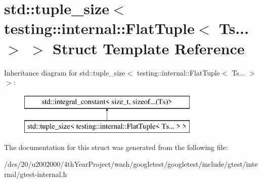 \hypertarget{structstd_1_1tuple__size_3_01testing_1_1internal_1_1FlatTuple_3_01Ts_8_8_8_01_4_01_4}{}\section{std\+:\+:tuple\+\_\+size$<$ testing\+:\+:internal\+:\+:Flat\+Tuple$<$ Ts... $>$ $>$ Struct Template Reference}
\label{structstd_1_1tuple__size_3_01testing_1_1internal_1_1FlatTuple_3_01Ts_8_8_8_01_4_01_4}
Inheritance diagram for std\+:\+:tuple\+\_\+size$<$ testing\+:\+:internal\+:\+:Flat\+Tuple$<$ Ts... $>$ $>$\+:\begin{figure}[H]
\begin{center}
\leavevmode
\includegraphics[height=2.000000cm]{structstd_1_1tuple__size_3_01testing_1_1internal_1_1FlatTuple_3_01Ts_8_8_8_01_4_01_4}
\end{center}
\end{figure}


The documentation for this struct was generated from the following file\+:\begin{DoxyCompactItemize}
\item 
/dcs/20/u2002000/4th\+Year\+Project/wash/googletest/googletest/include/gtest/internal/gtest-\/internal.\+h\end{DoxyCompactItemize}
